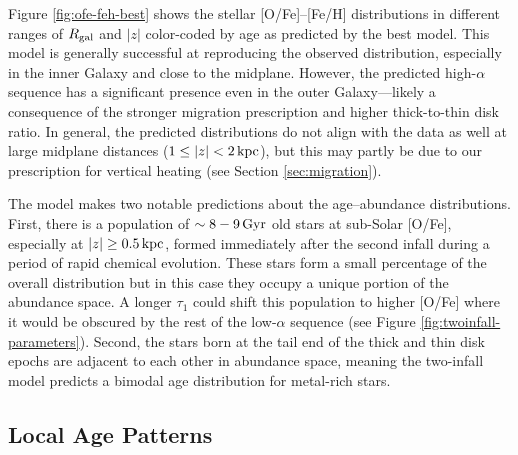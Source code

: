 \documentclass[twocolumn,twocolappendix,linenumbers]{aastex631}
\newcommand{\kpc}{\,{\rm kpc}}
\newcommand{\Gyr}{\,{\rm Gyr}}
\begin{document}
Figure \ref{fig:ofe-feh-best} shows the stellar [O/Fe]--[Fe/H] distributions in different ranges of $R_{\rm gal}$ and $|z|$ color-coded by age as predicted by the best model. This model is generally successful at reproducing the observed distribution, especially in the inner Galaxy and close to the midplane. However, the predicted high-$\alpha$ sequence has a significant presence even in the outer Galaxy---likely a consequence of the stronger migration prescription and higher thick-to-thin disk ratio. In general, the predicted distributions do not align with the data as well at large midplane distances ($1\leq|z|<2\kpc$), but this may partly be due to our prescription for vertical heating (see Section \ref{sec:migration}).

The model makes two notable predictions about the age--abundance distributions. First, there is a population of $\sim8-9\Gyr$ old stars at sub-Solar [O/Fe], especially at $|z|\ge0.5\kpc$, formed immediately after the second infall during a period of rapid chemical evolution. These stars form a small percentage of the overall distribution \citep[see also Figure 11 from][]{spitoni_remind_2024} but in this case they occupy a unique portion of the abundance space. A longer $\tau_1$ could shift this population to higher [O/Fe] where it would be obscured by the rest of the low-$\alpha$ sequence (see Figure \ref{fig:twoinfall-parameters}). Second, the stars born at the tail end of the thick and thin disk epochs are adjacent to each other in abundance space, meaning the two-infall model predicts a bimodal age distribution for metal-rich stars.

\subsection{Local Age Patterns}
\end{document}
